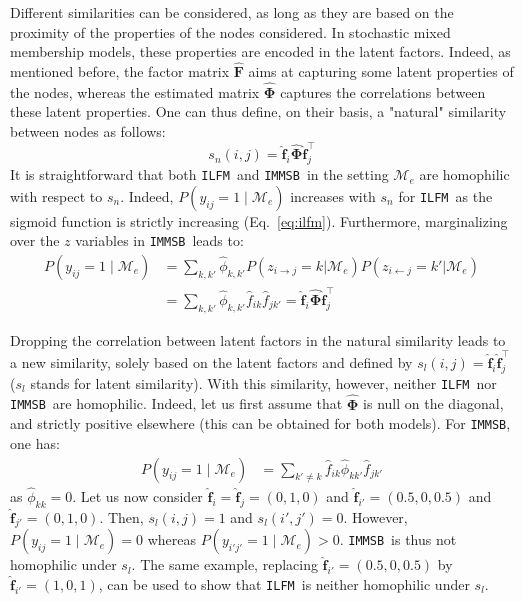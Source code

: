 \documentclass{llncs}
\newcommand{\ifm}{\texttt{ILFM}}
\newcommand{\imb}{\texttt{IMMSB}}
\newcommand{\pr}{P}
\newcommand{\M}{\mathcal{M}}
\newcommand{\mat}[1]{\mathbf{#1}}
\begin{document}
Different similarities can be considered, as long as they are based on the proximity of the properties of the nodes considered. In stochastic mixed membership models, these properties are encoded in the latent factors. Indeed, as mentioned before, the factor matrix $\mat{\hat{F}}$ aims at capturing some latent properties of the nodes, whereas the estimated matrix $\mat{\hat{\Phi}}$ captures the correlations between these latent properties. One can thus define, on their basis, a "natural" similarity between nodes as follows:
%
\begin{equation}
s_n(i,j) = \mat{\hat{f}}_{i} \mat{\hat{\Phi}} \mat{\hat{f}}_j^\top \nonumber
\end{equation}
%
It is straightforward that both \ifm\ and \imb\ in the setting $\mathcal{M}_e$ are homophilic with respect to $s_n$. Indeed, $\pr(y_{ij}=1 \mid \mathcal{M}_e)$ increases with $s_n$ for \ifm\ as the sigmoid function is strictly increasing (Eq.~\ref{eq:ilfm}). Furthermore, marginalizing over the $z$ variables in \imb\ leads to:
%
\begin{align}
\pr(y_{ij} =1 \mid \mathcal{M}_e) & = \sum_{k,k'} \hat{\phi}_{k,k'} \pr(z_{i \rightarrow j}=k | \mathcal{M}_e) \pr(z_{i \leftarrow j}=k' | \mathcal{M}_e) \nonumber \\
& = \sum_{k,k'} \hat{\phi}_{k,k'} \hat{f}_{ik} \hat{f}_{jk'} = \mat{\hat{f}}_{i} \mat{\hat{\Phi}} \mat{\hat{f}}_j^\top \nonumber
\end{align}

Dropping the correlation between latent factors in the natural similarity leads to a new similarity, solely based on the latent factors and defined by $s_l(i,j) = \mat{\hat{f}}_{i} \mat{\hat{f}}_j^\top \nonumber$ ($s_l$ stands for latent similarity). With this similarity, however, neither \ifm\  nor \imb\ are homophilic. Indeed, let us first assume that $\mat{\hat{\Phi}}$ is null on the diagonal, and strictly positive elsewhere (this can be obtained for both models). For \imb, one has:
%
\begin{align}
\pr(y_{ij}=1 \mid \M_e) & = \sum_{k' \neq k} \hat{f}_{ik} \hat{\phi}_{kk'} \hat{f}_{jk'} \nonumber 
\end{align}
%
as $\hat{\phi}_{kk} = 0$. Let us now consider $\mat{\hat{f}}_i=\mat{\hat{f}}_j=(0,1,0)$ and $\mat{\hat{f}}_{i'}=(0.5,0,0.5)$ and $\mat{\hat{f}}_{j'}=(0,1,0)$. Then, $s_l(i,j)=1$ and $s_l(i',j')=0$. However, $\pr(y_{ij}=1 \mid \M_e) = 0$ whereas $\pr(y_{i'j'}=1 \mid \M_e) > 0$. \imb\ is thus not homophilic under $s_l$. The same example, replacing $\mat{\hat{f}}_{i'}=(0.5,0,0.5)$ by $\mat{\hat{f}}_{i'}=(1,0,1)$, can be used to show that \ifm\ is neither homophilic under $s_l$.
\end{document}

